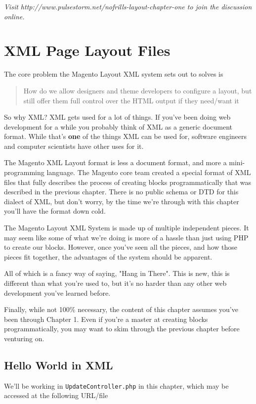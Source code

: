 \documentclass[oneside]{book}
\begin{document}
\emph{Visit http://www.pulsestorm.net/nofrills-layout-chapter-one to join the discussion online.}
\chapter{XML Page Layout Files}
The core problem the Magento Layout XML system sets out to solves is

\begin{quote}
How do we allow designers and theme developers to configure a layout, but still offer them full control over the HTML output if they need/want it
\end{quote}

So why XML? XML gets used for a lot of things.  If you've been doing web development for a while you probably think of XML as a generic document format. While that's \textbf{one} of the things XML can be used for, software engineers and computer scientists have other uses for it.

The Magento XML Layout format is less a document format, and more a mini-programming language.  The Magento core team created a special format of XML files that fully describes the process of creating blocks programmatically that was described in the previous chapter.  There is no public schema or DTD for this dialect of XML, but don't worry, by the time we're through with this chapter you'll have the format down cold.

The Magento Layout XML System is made up of multiple independent pieces.  It may seem like some of what we're doing is more of a hassle than just using PHP to create our blocks.  However, once you've seen all the pieces, and how those pieces fit together, the advantages of the system should be apparent.

All of which is a fancy way of saying, "Hang in There".  This is new, this is different than what you're used to, but it's no harder than any other web development you've learned before.

Finally, while not 100\% necessary, the content of this chapter assumes you've been through Chapter 1.  Even if you're a master at creating blocks programmatically, you may want to skim through the previous chapter before venturing on.

\section{Hello World in XML}

We'll be working in \footnotesize\texttt{UpdateController.php} \normalsize  in this chapter, which may be accessed at the following URL/file
\end{document}
